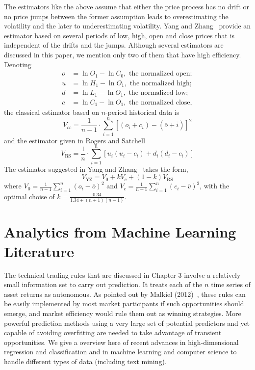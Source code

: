 The estimators like the above assume that either the price process has no drift or no price jumps between the former assumption leads to overestimating the volatility and the later to underestimating volatility. Yang and Zhang~\cite{yangzhang2000} provide an estimator based on several periods of low, high, open and close prices that is independent of the drifts and the jumps. Although several estimators are discussed in this paper, we mention only two of them that have high efficiency. Denoting
	\[
	\begin{split}
	o&= \ln O_1 - \ln C_0, \text{ the normalized open}; \\
	u&= \ln H_1 - \ln O_1, \text{ the normalized high}; \\
	d&= \ln L_1 - \ln O_1, \text{ the normalized low}; \\
	c&= \ln C_1 - \ln O_1,  \text{ the normalized close},
	\end{split}
	\]
the classical estimator based on $n$-period historical data is
	\begin{equation}\label{eqn:nperioddata}
	V_{cc}= \dfrac{1}{n-1} \cdot \sum_{i=1}^n [(o_i + c_i) - (\overline{o} + \overline{i})]^2
	\end{equation}
and the estimator given in Rogers and Satchell~\cite{rogerssatchell1991}
	\begin{equation}\label{eqn:rogerssatchell}
	V_{\text{RS}}= \dfrac{1}{n} \cdot \sum_{i=1}^n [u_i(u_i - c_i) + d_i(d_i-c_i)]
	\end{equation}
The estimator suggested in Yang and Zhang~\cite{yangzhang2000} takes the form,
	\begin{equation}\label{eqn:yang2000}
	V_{\text{YZ}}= V_0 + k V_c + (1-k)V_{\text{RS}}
	\end{equation}
where $V_0= \frac{1}{n-1} \sum_{i=1}^n (o_i-\overline{o})^2$ and $V_c=\frac{1}{n-1} \sum_{i=1}^n (c_i - \overline{v})^2$, with the optimal choise of $k=\frac{0.34}{1.34 + (n+1)(n-1)}$. 



\section{Analytics from Machine Learning Literature}


The technical trading rules that are discussed in Chapter 3 involve a relatively small information set to carry out prediction. It treats each of the $n$ time series of asset returns as autonomous. As pointed out by Malkiel (2012)~\cite{malkiel}, these rules can be easily implemented by most market participants if such opportunities should emerge, and market efficiency would rule them out as winning strategies. More powerful prediction methods using a very large set of potential predictors and yet capable of avoiding overfitting are needed to take advantage of transient opportunities. We give a overview here of recent advances in high-dimensional regression and classification and in machine learning and computer science to handle different types of data (including text mining).




